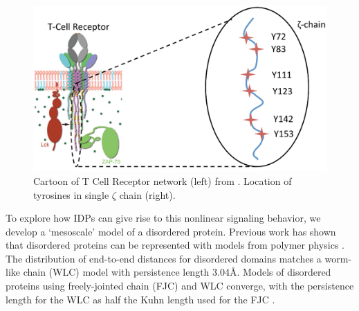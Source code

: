 \documentclass[../AdvancementSummary.tex]{subfiles}
\begin{document}
\begin{figure}
	\begin{center}
		\includegraphics[width=0.8\linewidth]{Figures/TCRDiagram.eps}
	\end{center}
\caption{Cartoon of T Cell Receptor network (left) from \cite{Wu2015}. Location of tyrosines in single $\zeta$ chain (right). \label{fig: TCRCartoon}}
\end{figure}


%
%

To explore how IDPs can give rise to this nonlinear signaling behavior, we develop a `mesoscale' model of a disordered protein. Previous work has shown that disordered proteins can be represented with models from polymer physics \cite{VanValen2009, Reeves2011}. The distribution of end-to-end distances for disordered domains matches a worm-like chain (WLC) model with persistence length 3.04\AA \cite{Zhou2001}. Models of disordered proteins using freely-jointed chain (FJC) and WLC converge, with the persistence length for the WLC as half the Kuhn length used for the FJC \cite{VanValen2009}.
\end{document}
